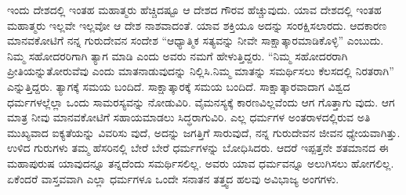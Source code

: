 ಇಂದು ದೇಶದಲ್ಲಿ ಇಂತಹ ಮಹಾತ್ಮರು ಹೆಚ್ಚಿದಷ್ಟೂ ಆ ದೇಶದ ಗೌರವ ಹೆಚ್ಚುವುದು. ಯಾವ ದೇಶದಲ್ಲಿ ಇಂತಹ ಮಹಾತ್ಮರು ಇಲ್ಲವೇ ಇಲ್ಲವೋ ಆ ದೇಶ ನಾಶವಾದಂತೆ. ಯಾವ ಶಕ್ತಿಯೂ ಅದನ್ನು ಸಂರಕ್ಷಿಸಲಾರದು. ಆದಕಾರಣ ಮಾನವಕೋಟಿಗೆ ನನ್ನ ಗುರುದೇವನ ಸಂದೇಶ “ಆಧ್ಯಾತ್ಮಿಕ ಸತ್ಯವನ್ನು ನೀವೇ ಸಾಕ್ಷಾತ್ಕಾರಮಾಡಿಕೊಳ್ಳಿ” ಎಂಬುದು. ನಿಮ್ಮ ಸಹೋದರರಿಗಾಗಿ ತ್ಯಾಗ ಮಾಡಿ ಎಂದು ಅವರು ನಮಗೆ ಹೇಳುತ್ತಿದ್ದರು. “ನಿಮ್ಮ ಸಹೋದರರಾಗಿ ಪ್ರೀತಿಯನ್ನುತೋರುವೆವು ಎಂದು ಮಾತನಾಡುವುದನ್ನು ನಿಲ್ಲಿಸಿ.ನಿಮ್ಮ ಮಾತನ್ನು ಸಮರ್ಥಿಸಲು ಕೆಲಸದಲ್ಲಿ ನಿರತರಾಗಿ” ಎನ್ನುತ್ತಿದ್ದರು. ತ್ಯಾಗಕ್ಕೆ ಸಮಯ ಬಂದಿದೆ. ಸಾಕ್ಷಾತ್ಕಾರಕ್ಕೆ ಸಮಯ ಬಂದಿದೆ. ಸಾಕ್ಷಾತ್ಕಾರವಾದಾಗ ವಿಶ್ವದ ಧರ್ಮಗಳಲ್ಲೆಲ್ಲಾ ಒಂದು ಸಾಮರಸ್ಯವನ್ನು ನೋಡುವಿರಿ. ವೈಮನಸ್ಯಕ್ಕೆ ಕಾರಣವಿಲ್ಲವೆಂದು ಆಗ ಗೊತ್ತಾಗು ವುದು. ಆಗ ಮಾತ್ರ ನೀವು ಮಾನವಕೋಟಿಗೆ ಸಹಾಯಮಾಡಲು ಸಿದ್ಧರಾಗುವಿರಿ. ಎಲ್ಲ ಧರ್ಮಗಳ ಅಂತರಾಳದಲ್ಲಿರುವ ಅತಿ ಮುಖ್ಯವಾದ ಐಕ್ಯತೆಯನ್ನು ವಿವರಿಸು ವುದೆ, ಅದನ್ನು ಜಗತ್ತಿಗೆ ಸಾರುವುದೆ, ನನ್ನ ಗುರುದೇವನ ಜೀವನ ಧ್ಯೇಯವಾಗಿತ್ತು. ಉಳಿದ ಗುರುಗಳು ತಮ್ಮ ಹೆಸರಿನಲ್ಲಿ ಬೇರೆ ಬೇರೆ ಧರ್ಮಗಳನ್ನು ಬೋಧಿಸಿದರು. ಆದರೆ ಇಪ್ಪತ್ತನೇ ಶತಮಾನದ ಈ ಮಹಾಪುರುಷ ಯಾವುದನ್ನೂ ತನ್ನದೆಂದು ಸಮರ್ಥಿಸಲಿಲ್ಲ. ಅವರು ಯಾವ ಧರ್ಮವನ್ನೂ ಅಲುಗಿಸಲು ಹೋಗಲಿಲ್ಲ. ಏಕೆಂದರೆ ವಾಸ್ತವವಾಗಿ ಎಲ್ಲಾ ಧರ್ಮಗಳೂ ಒಂದೇ ಸನಾತನ ತತ್ತ್ವದ ಹಲವು ಅವಿಭಾಜ್ಯ ಅಂಗಗಳು.

